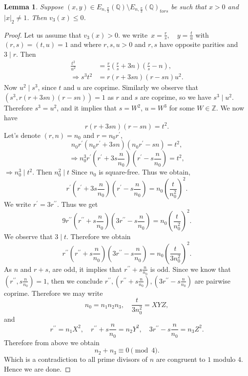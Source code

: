 \documentclass[11pt]{article}
\newcommand{\Z}{ {\mathbb{Z}} }
\newcommand{\Q}{ {\mathbb{Q}} }
\newtheorem{lemma}[theorem]{Lemma}
\begin{document}
\begin{lemma}\label{lmma}
Suppose $(x,y)\in E_{n,\frac{\pi}{3}}(\Q)\setminus  E_{n,\frac{\pi}{3}}(\Q)_{tors}$ be such that $x>0$ and $|x|_{2}\neq 1$. Then $v_{3}(x)\leq 0$.
\end{lemma}
\begin{proof}
Let us assume that $v_{3}(x)>0$. we write $\, x=\frac{r}{s},\quad y=\frac{t}{u}$ with $(r,s)=(t,u)=1$ and where $r,s,u >0$ and $r,s$ have opposite parities and $3\mid r$. Then
\begin{align*}
\frac{t^{2}}{u^{2}}  & =\frac{r}{s}(\frac{r}{s}+3n)(\frac{r}{s}-n), \\ 
\Rightarrow s^{3}t^{2} &  =r(r+3sn)(r-sn)u^{2}.
\end{align*}
Now $u^{2}\mid s^{3}$, since $t$ and $u$ are coprime. Similarly we observe that $(s^{3}, r(r+3sn)(r-sn))=1$ as $r$ and $s$ are coprime, so we have $s^{3}\mid u^{2}$. Therefore $s^{3}=u^{2}$, and it implies that $s=W^{2}$, $u=W^{3}$ for some $W \in \Z$. We now have
$$r(r+3sn)(r-sn)=t^{2}.$$ 
Let's denote $(r,n)=n_{0}$ and $r=n_{0}r^{\prime}$, 
$$n_{0}r^{\prime}(n_{0}r^{\prime}+3sn)(n_{0}r^{\prime}-sn)=t^{2},$$
$$\Rightarrow n_{0}^{3}r^{\prime}(r^{\prime}+3s\frac{n}{n_{0}})(r^{\prime}-s\frac{n}{n_{0}})=t^{2},$$
$\Rightarrow n_{0}^{3}\mid t^{2}$. Then $n_{0}^{2}\mid t$ Since $n_{0}$ is square-free. Thus we obtain, 
$$r^{\prime}(r^{\prime}+3s\frac{n}{n_{0}})(r^{\prime}-s\frac{n}{n_{0}})=n_{0}\left( \frac{t}{n_{0}^{2}} \right)^{2}.$$
We write $r^{\prime}=3r^{\prime\prime}$. Thus we get
$$9r^{\prime\prime}(r^{\prime\prime}+s\frac{n}{n_{0}})(3r^{\prime\prime}-s\frac{n}{n_{0}})=n_{0}\left( \frac{t}{n_{0}^{2}} \right)^{2}.$$
We observe that $3\mid t$. Therefore we obtain
$$r^{\prime\prime}(r^{\prime\prime}+s\frac{n}{n_{0}})(3r^{\prime\prime}-s\frac{n}{n_{0}})=n_{0}\left( \frac{t}{3n_{0}^{2}} \right)^{2}.$$
As $n$ and $r+s$, are odd, it implies that  $r^{\prime\prime}+s\frac{n}{n_{0}}$ is odd. Since we know that $(r^{\prime\prime},s\frac{n}{n_{0}})=1$, then we conclude $r^{\prime\prime}, (r^{\prime\prime}+s\frac{n}{n_{0}}), (3r^{\prime\prime}-s\frac{n}{n_{0}})$ are pairwise coprime. Therefore we may write
$$n_{0}=n_{1}n_{2}n_{3},\quad \frac{t}{3n_{0}^{2}}=XYZ,$$
and
$$r^{\prime\prime}=n_{1}X^{2},\quad r^{\prime\prime}+s\frac{n}{n_{0}}=n_{2}Y^{2},\quad 3r^{\prime\prime}-s\frac{n}{n_{0}}=n_{3}Z^{2}.$$
Therefore from above we obtain
$$n_{2}+n_{3}\equiv 0\pmod{4}.$$
Which is a contradiction to all prime divisors of $n$ are congruent to $1$ modulo $4$.
Hence we are done.
\end{proof}
\end{document}
